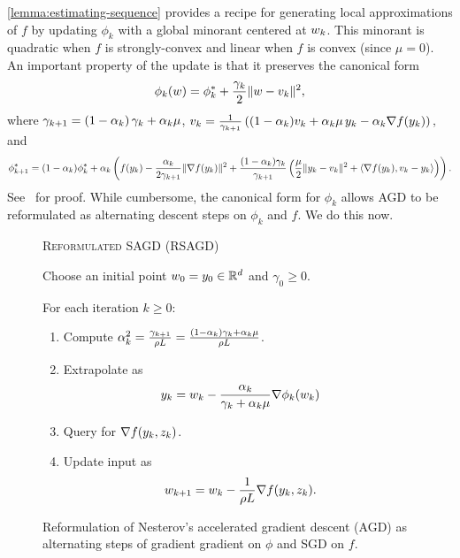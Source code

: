 \autoref{lemma:estimating-sequence} provides a recipe for generating local approximations of \( f \) by updating \( \phi_k \) with a global minorant centered at \( w_k \). 
This minorant is quadratic when \( f \) is strongly-convex and linear when \( f \) is convex (since \( \mu = 0 \)).
An important property of the update is that it preserves the canonical form
\begin{align*}
    \phi_k(w) = \phi_k^* + \frac{\gamma_k}{2}\|w - v_k\|^2,
\end{align*}
where \( \gamma_{k+1} = \left(1 - \alpha_{k}\right)\gamma_k + \alpha_{k} \mu \), \( v_k = \frac{1}{\gamma_{k+1}} \left((1-\alpha_{k})v_k + \alpha_{k} \mu \, y_k - \alpha_{k} \nabla f(y_k)\right), \) and 
\[ \phi^*_{k+1} = (1 - \alpha_{k}) \phi^*_k + \alpha_{k}\left(f(y_k) - \frac{\alpha_{k}}{2 \gamma_{k+1}} \|\nabla f(y_k)\|^2 + \frac{(1 - \alpha_{k})\gamma_k}{\gamma_{k+1}}\left(\frac{\mu}{2}\|y_k - v_k\|^2 + \left\langle\nabla f(y_k), v_k - y_k\right\rangle\right)\right). \]
See~\citet[Lemma 2.2.3]{nesterov2004lectures} for proof.
While cumbersome, the canonical form for \( \phi_k \) allows \ac{AGD} to be reformulated as alternating descent steps on \( \phi_k \) and \( f \).
We do this now.

\begin{figure}[t]
    \centering
    \begin{procedure}{\textsc{Reformulated} \ac{SAGD} (\acs{RSAGD})}
        \item Choose an initial point \( w_0 = y_0 \in \mathbb{R}^d \) and \( \gamma_0 \geq 0 \).
        \item For each iteration \( k \geq 0 \):
            \begin{enumerate}
                \item Compute 
                    \( \alpha^2_k = \frac{\gamma_{k+1}}{\rho L } = \frac{(1-\alpha_k)\gamma_k + \alpha_k \mu}{\rho L} \).
                \item Extrapolate as
                    \[ y_k = w_k - \frac{\alpha_k}{\gamma_k + \alpha_k \mu} \nabla \phi_k(w_k) \]

                \item Query \oracle{} for \( \nabla f(y_k, z_{k}) \). 
                \item Update input as\vspace{-1ex}%
                    \[ w_{k+1} = w_k - \frac{1}{\rho L} \nabla f(y_k, z_{k}). \]
            \end{enumerate}
    \end{procedure}
    \caption{Reformulation of Nesterov's accelerated gradient descent (AGD) as alternating steps of gradient gradient on \( \phi \) and \ac{SGD} on \( f \).}%
    \label{procedure:reformulated-agd}
\end{figure}

